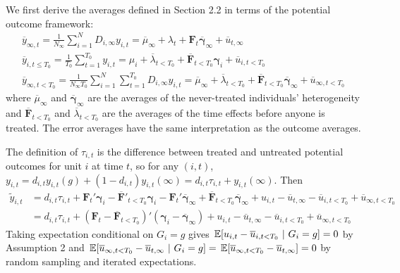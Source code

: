 \documentclass[12pt]{article}
\begin{document}
We first derive the averages defined in Section 2.2 in terms of the potential outcome framework:
\begin{gather*}
    \overline{y}_{\infty , t} = \frac{1}{N_{\infty}} \sum_{i = 1}^N D_{i, \infty} y_{i,t} = \overline{\mu}_{\infty} + \lambda_t + \bm{F}_t \overline{\bm \gamma}_{\infty} + \overline{u}_{t, \infty}\\
    \overline{y}_{i,t\leq T_0} = \frac{1}{T_0} \sum_{t = 1}^{T_0} y_{i,t} = \mu_i + \overline{\lambda}_{t < T_0} + \overline{\bm{F}}_{t < T_0} \bm \gamma_i + \overline{u}_{i,t < T_0}\\
    \overline{y}_{\infty, t < T_0} = \frac{1}{N_{\infty} T_0} \sum_{i = 1}^N \sum_{t = 1}^{T_0} D_{i, \infty} y_{i,t} = \overline{\mu}_{\infty} + \overline{\lambda}_{t < T_0} + \overline{\bm{F}}_{t < T_0} \overline{\bm \gamma}_{\infty} + \overline{u}_{\infty, t < T_0}
\end{gather*}
where $\overline{\mu}_{\infty}$ and $\overline{\bm \gamma}_{\infty}$ are the averages of the never-treated individuals' heterogeneity and $\overline{\bm{F}}_{t < T_0}$ and $\overline{\lambda}_{t < T_0}$ are the averages of the time effects before anyone is treated. The error averages have the same interpretation as the outcome averages.

The definition of $\tau_{i,t}$ is the difference between treated and untreated potential outcomes for unit $i$ at time $t$, so for any $(i,t)$, $y_{i,t} = d_{i,t} y_{i,t}(g) + (1-d_{i,t})y_{i,t}(\infty) = d_{i,t} \tau_{i,t} + y_{i,t}(\infty)$. Then
\begin{align*}
    \tilde{y}_{i,t} 
    &= d_{i,t} \tau_{i,t} + \bm{F}_t' \bm \gamma_i - \overline{\bm{F}}'_{t < T_0} \bm \gamma_i - \bm{F}_t' \overline{\bm \gamma}_{\infty} + \overline{\bm{F}}_{t < T_0} \overline{\bm \gamma}_{\infty} + u_{i,t} - \overline{u}_{t,\infty} - \overline{u}_{i, t < T_0} + \overline{u}_{\infty, t < T_0}\\
    &= d_{i,t} \tau_{i,t} + (\bm{F}_t - \overline{\bm{F}}_{t < T_0})' (\bm \gamma_i - \overline{\bm \gamma}_{\infty}) + u_{i,t} - \overline{u}_{t,\infty} - \overline{u}_{i, t < T_0} + \overline{u}_{\infty, t < T_0}
\end{align*}
Taking expectation conditional on $G_i = g$ gives $\expec{u_{i,t} - \overline{u}_{i, t < T_0}}{G_i = g} = 0$ by Assumption 2 and $\expec{\overline{u}_{\infty, t < T_0} - \overline{u}_{t, \infty} }{G_i = g} = \expec{\overline{u}_{\infty, t < T_0} - \overline{u}_{t, \infty}} = 0$ by random sampling and iterated expectations.
\end{document}
